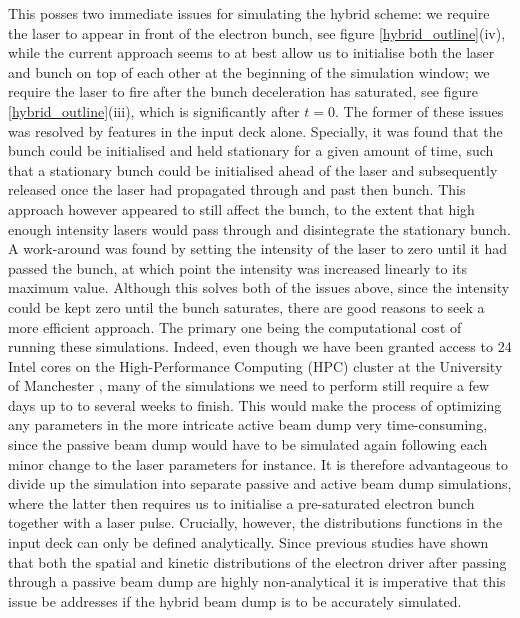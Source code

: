\indent This posses two immediate issues for simulating the hybrid scheme: we require the laser to appear in front of the electron bunch, see figure \ref{hybrid_outline}(iv), while the current approach seems to at best allow us to initialise both the laser and bunch on top of each other at the beginning of the simulation window; we require the laser to fire after the bunch deceleration has saturated, see figure \ref{hybrid_outline}(iii), which is significantly after $t=0$. The former of these issues was resolved by features in the input deck alone. Specially, it was found that the bunch could be initialised and held stationary for a given amount of time, such that a stationary bunch could be initialised ahead of the laser and subsequently released once the laser had propagated through and past then bunch. This approach however appeared to still affect the bunch, to the extent that high enough intensity lasers would pass through and disintegrate the stationary bunch. A work-around was found by setting the intensity of the laser to zero until it had passed the bunch, at which point the intensity was increased linearly to its maximum value. Although this solves both of the issues above, since the intensity could be kept zero until the bunch saturates, there are good reasons to seek a more efficient approach. The primary one being the computational cost of running these simulations. Indeed, even though we have been granted access to 24 Intel cores on the High-Performance Computing (HPC) cluster at the University of Manchester \cite{CSF}, many of the simulations we need to perform still require a few days up to to several weeks to finish. This would make the process of optimizing any parameters in the more intricate active beam dump very time-consuming, since the passive beam dump would have to be simulated again following each minor change to the laser parameters for instance. It is therefore advantageous to divide up the simulation into separate passive and active beam dump simulations, where the latter then requires us to initialise a pre-saturated electron bunch together with a laser pulse.
Crucially, however, the distributions functions in the input deck can only be defined analytically. Since previous studies \cite{Wu2010, Bonatto2015, Hanahoe2017} have shown that both the spatial and kinetic distributions of the electron driver after passing through a passive beam dump are highly non-analytical it is imperative that this issue be addresses if the hybrid beam dump is to be accurately simulated. 

